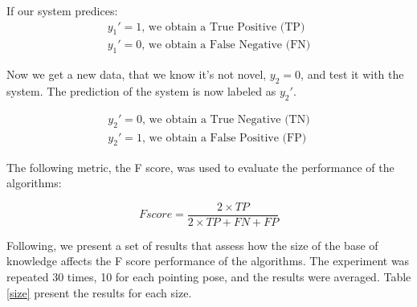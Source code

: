 If our system predices: 
\begin{equation}
\begin{split}
y_1' = 1 \mbox{, we obtain a True Positive (TP)} \\
y_1' = 0\mbox{, we obtain a False Negative (FN)}
\end{split}
\end{equation}

Now we get a new data, that we know it's not novel, $y_2 = 0$, and test it with the system. The prediction of the system is now labeled as $y_2'$.

\begin{equation}
\begin{split}
y_2' = 0\mbox{, we obtain a True Negative (TN)} \\
y_2' = 1\mbox{, we obtain a False Positive (FP)} 
\end{split}
\end{equation}

The following metric, the F score, was used to evaluate the performance of the algorithms:

\begin{equation}
F score = \dfrac{2 \times TP}{2 \times TP+FN+FP}
\end{equation}

Following, we present a set of results that assess how the size of the base of knowledge affects the F score performance of the algorithms. The experiment was repeated 30 times, 10 for each pointing pose, and the results were averaged. Table \ref{size} present the results for each size.

